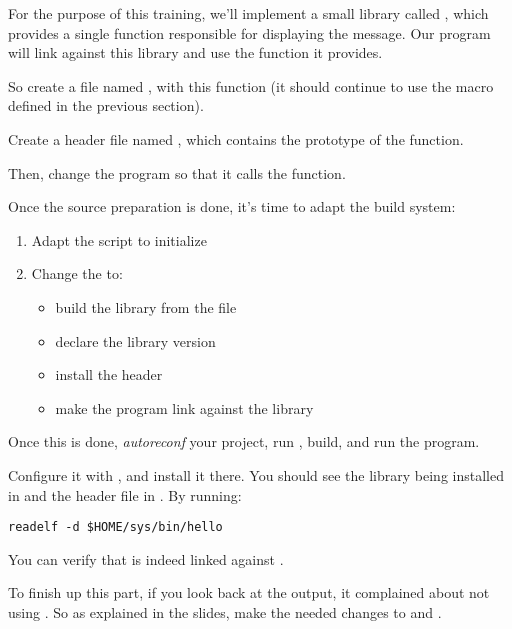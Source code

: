 For the purpose of this training, we'll implement a small library
called , which provides a single function
 responsible for displaying the 
message. Our program will link against this library and use the
function it provides.

So create a file named , with this function
 (it should continue to use the
 macro defined in the previous section).

Create a header file named , which contains the
prototype of the  function.

Then, change the  program so that it calls the
 function.

Once the source preparation is done, it's time to adapt the build
system:

\begin{enumerate}
\item Adapt the  script to initialize
\item Change the  to:
  \begin{itemize}
  \item build the  library from the  file
  \item declare the library version
  \item install the  header
  \item make the  program link against the 
    library
  \end{itemize}
\end{enumerate}

Once this is done, {\em autoreconf} your project, run
, build, and run the  program.

Configure it with , and install it there. You
should see the library being installed in  and the
header file in . By running:

\begin{verbatim}
readelf -d $HOME/sys/bin/hello
\end{verbatim}

You can verify that  is indeed linked against
.

To finish up this part, if you look back at the 
output, it complained about  not using
. So as explained in the slides, make the
needed changes to  and .

